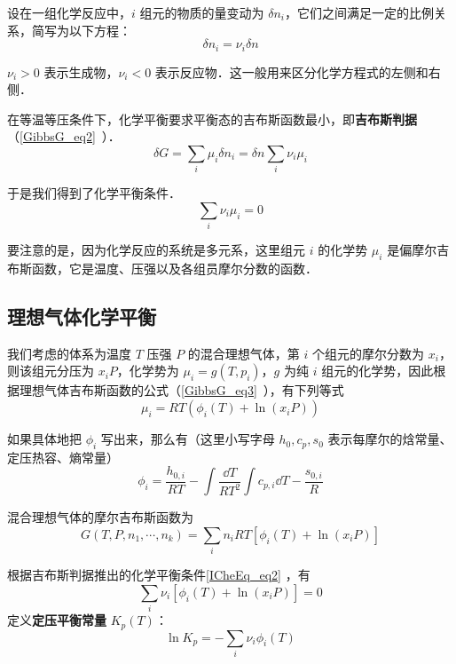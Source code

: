 

设在一组化学反应中，$i$ 组元的物质的量变动为 $\delta n_i$，它们之间满足一定的比例关系，简写为以下方程：
\begin{equation}
\delta n_i=\nu_i \delta n
\end{equation}

$\nu_i>0$ 表示生成物，$\nu_i<0$ 表示反应物．这一般用来区分化学方程式的左侧和右侧．

在等温等压条件下，化学平衡要求平衡态的吉布斯函数最小，即\textbf{吉布斯判据}（\autoref{GibbsG_eq2}~）．
\begin{equation}
\delta G=\sum_i \mu_i\delta n_i=\delta n\sum_i \nu_i\mu_i
\end{equation}

于是我们得到了化学平衡条件．
\begin{equation}\label{ICheEq_eq2}
\sum_i\nu_i\mu_i=0
\end{equation}

要注意的是，因为化学反应的系统是多元系，这里组元 $i$ 的化学势 $\mu_i$ 是偏摩尔吉布斯函数，它是温度、压强以及各组员摩尔分数的函数．

\subsection{理想气体化学平衡}

我们考虑的体系为温度 $T$ 压强 $P$ 的混合理想气体，第 $i$ 个组元的摩尔分数为 $x_i$，则该组元分压为 $x_iP$，化学势为 $\mu_i=g(T,p_i)$，$g$ 为纯 $i$ 组元的化学势，因此根据理想气体吉布斯函数的公式（\autoref{GibbsG_eq3}~），有下列等式
\begin{equation}\label{ICheEq_eq1}
\mu_i=RT(\phi_i(T)+\ln(x_iP))
\end{equation}

如果具体地把 $\phi_i$ 写出来，那么有（这里小写字母 $h_0,c_p,s_0$ 表示每摩尔的焓常量、定压热容、熵常量）
\begin{equation}
\phi_i=\frac{h_{0,i}}{RT}-\int\frac{\dd T}{RT^2}\int c_{p,i}\dd T-\frac{s_{0,i}}{R}
\end{equation}

混合理想气体的摩尔吉布斯函数为
\begin{equation}
G(T,P,n_1,\cdots,n_k)=\sum_i n_iRT[\phi_i(T)+\ln(x_iP)]
\end{equation}

根据吉布斯判据推出的化学平衡条件\autoref{ICheEq_eq2} ，有
\begin{equation}\label{ICheEq_eq3}
\sum_i\nu_i[\phi_i(T)+\ln (x_iP)]=0
\end{equation}
定义\textbf{定压平衡常量} $K_p(T)$：
\begin{equation}\label{ICheEq_eq5}
\ln K_p=-\sum_i\nu_i\phi_i(T)
\end{equation}

